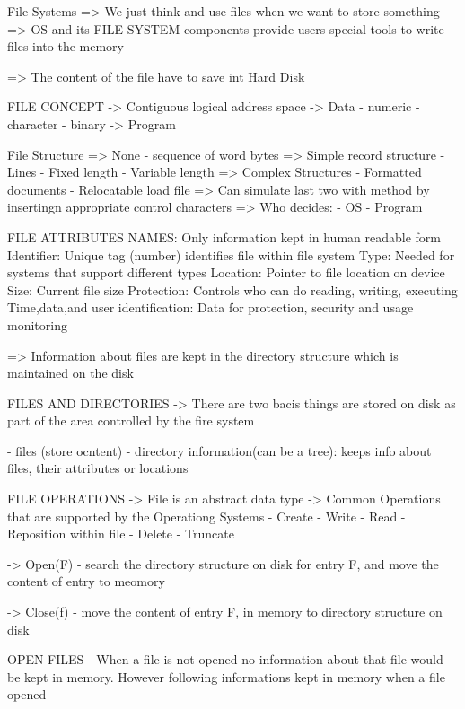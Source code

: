                            File Systems 
=> We just think and use files when we want to store something 
=> OS and its FILE SYSTEM components provide users special tools to write 
   files into the memory 

=> The content of the file have to save int Hard Disk 


FILE CONCEPT 
-> Contiguous logical address space 
-> Data 
    - numeric 
    - character
    - binary 
-> Program 

                            File Structure 
=> None - sequence of word bytes 
=> Simple record structure 
    - Lines 
    - Fixed length 
    - Variable length 
=> Complex Structures 
    - Formatted documents 
    - Relocatable load file 
=> Can simulate last two with method by insertingn appropriate control characters 
=> Who decides:
    - OS 
    - Program 


                        FILE ATTRIBUTES 
NAMES: Only information kept in human readable form 
Identifier: Unique tag (number) identifies file within file system 
Type: Needed for systems that support different types 
Location: Pointer to file location on device 
Size: Current file size 
Protection: Controls who can do reading, writing, executing
Time,data,and user identification: Data for protection, security and usage 
monitoring 

=> Information about files are kept in the directory structure which is
maintained on the disk


FILES AND DIRECTORIES 
-> There are two bacis things are stored on disk as part of the area controlled 
   by the fire system 

   - files (store ocntent)
   - directory information(can be a tree): keeps info about files, their
   attributes or locations 


FILE OPERATIONS 
-> File is an abstract data type 
-> Common Operations that are supported by the Operationg Systems 
    - Create 
    - Write 
    - Read 
    - Reposition within file 
    - Delete 
    - Truncate 

-> Open(F) - search the directory structure on disk for entry F, and move the 
    content of entry to meomory 

-> Close(f) - move the content of entry F, in memory to directory structure 
   on disk 


OPEN FILES 
- When a file is not opened no information about that file would be kept in 
memory. However following informations kept in memory when a file opened 

